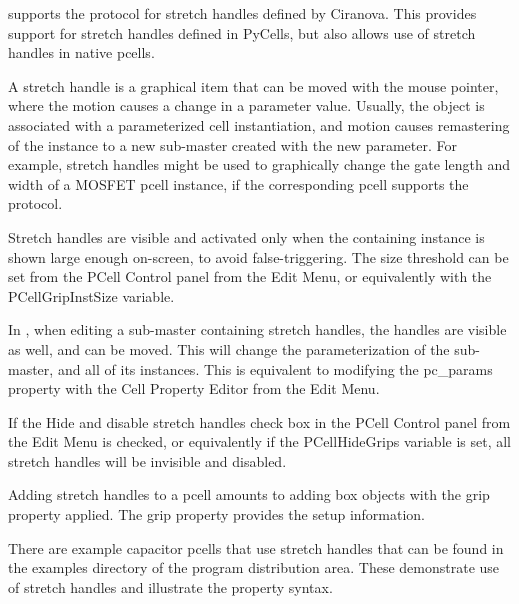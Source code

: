 {\Xic} supports the protocol for stretch handles defined by Ciranova. 
This provides support for stretch handles defined in PyCells, but also
allows use of stretch handles in native pcells.

A stretch handle is a graphical item that can be moved with the mouse
pointer, where the motion causes a change in a parameter value. 
Usually, the object is associated with a parameterized cell
instantiation, and motion causes remastering of the instance to a new
sub-master created with the new parameter.  For example, stretch
handles might be used to graphically change the gate length and width
of a MOSFET pcell instance, if the corresponding pcell supports the
protocol.

Stretch handles are visible and activated only when the containing
instance is shown large enough on-screen, to avoid false-triggering. 
The size threshold can be set from the {\cb PCell Control} panel from
the {\cb Edit Menu}, or equivalently with the {\et PCellGripInstSize}
variable.

In {\Xic}, when editing a sub-master containing stretch handles, the
handles are visible as well, and can be moved.  This will change the
parameterization of the sub-master, and all of its instances.  This is
equivalent to modifying the {\et pc\_params} property with the {\cb
Cell Property Editor} from the {\cb Edit Menu}.

If the {\cb Hide and disable stretch handles} check box in the {\cb
PCell Control} panel from the {\cb Edit Menu} is checked, or
equivalently if the {\et PCellHideGrips} variable is set, all stretch
handles will be invisible and disabled.

Adding stretch handles to a pcell amounts to adding box objects with
the {\et grip} property applied.  The {\et grip} property provides the
setup information.

There are example capacitor pcells that use stretch handles that can
be found in the examples directory of the {\Xic} program distribution
area.  These demonstrate use of stretch handles and illustrate the
property syntax.


